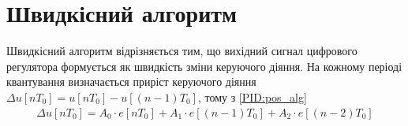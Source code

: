 \section{Швидкісний алгоритм}
Швидкісний алгоритм відрізняється тим, що вихідний сигнал цифрового регулятора формується як швидкість зміни керуючого діяння.
На кожному періоді квантування визначається приріст керуючого діяння
$\Delta u\left[n T_0\right] = u\left[n T_0\right] - u\left[(n-1) T_0\right]$,
тому з \eqref{PID:pos_alg}
\begin{gather}
    \Delta u\left[n T_0\right] = 
    A_0 \cdot e\left[n T_0\right] + A_1 \cdot e\left[(n-1) T_0\right] + A_2 \cdot e\left[(n-2) T_0\right]
\end{gather}
